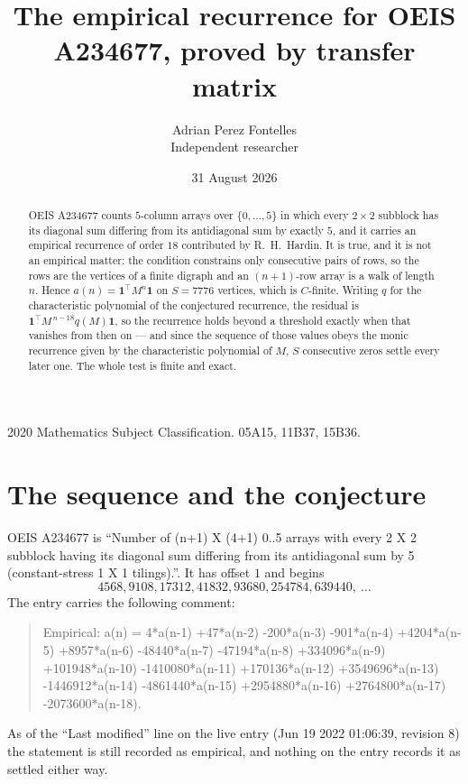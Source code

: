 \documentclass[11pt,a4paper]{article}
\title{The empirical recurrence for OEIS A234677, proved by transfer matrix}
\author{Adrian Perez Fontelles\\ \small Independent researcher}
\date{31 August 2026}
\theoremstyle{plain}
\theoremstyle{definition}
\begin{document}
\maketitle

\begin{abstract}
OEIS A234677 counts $5$-column arrays over $\{0,\dots,5\}$ in which every
$2\times2$ subblock has its diagonal sum differing from its antidiagonal sum by
exactly $5$, and it
carries an empirical recurrence of order $18$ contributed by R.~H.~Hardin. It is true,
and it is not an empirical matter: the condition constrains only consecutive pairs of rows,
so the rows are the vertices of a finite digraph and an $(n+1)$-row array is a walk of
length $n$. Hence $a(n)=\mathbf{1}^{\!\top}M^{n}\mathbf{1}$ on $S=7776$ vertices, which
is $C$-finite. Writing $q$ for the characteristic polynomial of the conjectured recurrence,
the residual is $\mathbf{1}^{\!\top}M^{\,n-18}q(M)\mathbf{1}$, so the recurrence
holds beyond a threshold exactly when that vanishes from then on --- and since the sequence
of those values obeys the monic recurrence given by the characteristic polynomial of $M$,
$S$ consecutive zeros settle every later one. The whole test is finite and exact.
\end{abstract}

\noindent\small 2020 Mathematics Subject Classification. 05A15, 11B37, 15B36.\normalsize

\section{The sequence and the conjecture}

OEIS A234677 is ``Number of (n+1) X (4+1) 0..5 arrays with every 2 X 2 subblock having its diagonal sum differing from its antidiagonal sum by 5 (constant-stress 1 X 1 tilings).''. It has offset
$1$ and begins
\[
4568, 9108, 17312, 41832, 93680, 254784, 639440,\ \dots
\]
The entry carries the following comment:
\begin{quote}\small
Empirical: a(n) = 4*a(n-1) +47*a(n-2) -200*a(n-3) -901*a(n-4) +4204*a(n-5) +8957*a(n-6) -48440*a(n-7) -47194*a(n-8) +334096*a(n-9) +101948*a(n-10) -1410080*a(n-11) +170136*a(n-12) +3549696*a(n-13) -1446912*a(n-14) -4861440*a(n-15) +2954880*a(n-16) +2764800*a(n-17) -2073600*a(n-18).
\end{quote}
As of the ``Last modified'' line on the live entry (Jun 19 2022 01:06:39, revision 8) the statement is
still recorded as empirical, and nothing on the entry records it as settled either way.
\end{document}
